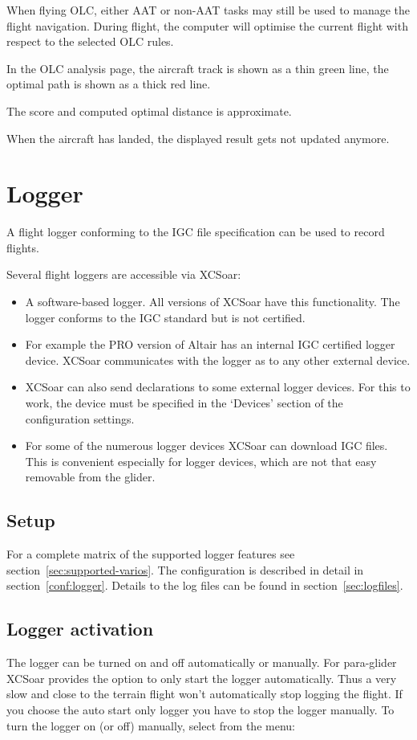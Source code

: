 When flying OLC, either AAT or non-AAT tasks may still be used to
manage the flight navigation.  During flight, the computer will optimise the
current flight with respect to the selected OLC rules.

In the OLC analysis page, the aircraft track is shown as a thin green line, the optimal
path is shown as a thick red line.

The score and computed optimal distance is approximate.

When the aircraft has landed, the displayed result gets not updated anymore.


\section{Logger}\label{sec:logger}

A flight logger conforming to the IGC file specification can be used
to record flights.

Several flight loggers are accessible via XCSoar:
\begin{itemize}
\item A software-based logger.  All versions of XCSoar have this
  functionality.  The logger conforms to the IGC standard but is not
  certified.
\item For example the PRO version of Altair has an internal IGC certified logger
  device.  XCSoar communicates with the logger as to any other external device.
\item XCSoar can also send declarations to some external logger devices.
  For this to work, the device must be specified in the `Devices'
  section of the configuration  settings.
\item  For some of the numerous logger devices XCSoar can download IGC files.
  This is convenient especially for logger devices, which are not that easy
  removable from the glider.
\end{itemize}

\subsection*{Setup}
For a complete matrix of the supported logger features see section~\ref{sec:supported-varios}.
The configuration is described in detail in section~\ref{conf:logger}.  Details
to the log files can be found in section~\ref{sec:logfiles}.

\subsection*{Logger activation}
The logger can be turned on and off automatically or manually.  For para-glider
XCSoar provides the option to only start the logger automatically. Thus a very
slow and close to the terrain flight won't automatically stop logging the flight.
If you choose the auto start only logger you have to stop the logger manually.
To turn the logger on (or off) manually, select from the menu:
\begin{quote}
\blink{}
\end{quote}

